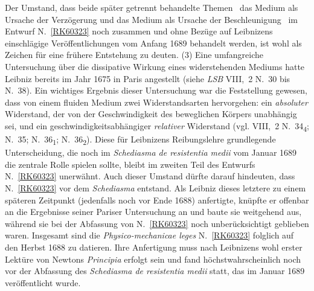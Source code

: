 \begin{ledgroup}
Der Umstand, dass beide später getrennt behandelte Themen \textendash\ das Medium als Ursache der Verzögerung und das Medium als Ursache der Beschleunigung \textendash\ im Entwurf N.~\ref{RK60323} noch zusammen und ohne Bezüge auf Leibnizens einschlägige Veröffentlichungen vom Anfang 1689 behandelt werden, ist wohl als Zeichen für eine frühere Entstehung zu deuten.
\pend%
%
\pstart%
(3) 
Eine umfangreiche Untersuchung über die dissipative Wirkung eines widerstehenden Mediums hatte Leibniz bereits im Jahr 1675 in Paris angestellt (siehe \textit{LSB} VIII,~2 N.~30 bis N.~38).
Ein wichtiges Ergebnis dieser Untersuchung war die Feststellung gewesen, dass von einem fluiden Medium zwei Widerstandsarten hervorgehen: ein \textit{absoluter} Widerstand, der von der Geschwindigkeit des beweglichen Körpers unabhängig sei, und ein geschwindigkeitsabhängiger \textit{relativer} Widerstand %
(vgl. VIII,~2 N.~34\textsubscript{4}; N.~35; N.~36\textsubscript{1}; N.~36\textsubscript{2}).\cite{01368}\cite{01369}\cite{01370}\cite{01371}
Diese für Leibnizens Reibungslehre grundlegende Unterscheidung, %
die noch im \textit{Schediasma de resistentia medii}\cite{01024} vom Januar 1689 die zentrale Rolle spielen sollte, bleibt im zweiten Teil des Entwurfs N.~\ref{RK60323} unerwähnt.
Auch dieser Umstand dürfte darauf hindeuten, dass N.~\ref{RK60323} vor dem \textit{Schediasma}\cite{01024} entstand.
Als Leibniz dieses letztere zu einem späteren Zeitpunkt (jedenfalls noch vor Ende 1688) anfertigte, knüpfte er offenbar an die Ergebnisse seiner Pariser Untersuchung an und baute sie weitgehend aus, während sie bei der Abfassung von N.~\ref{RK60323} noch unberücksichtigt geblieben waren.
\pend%
%
\pstart%
Insgesamt sind die \textit{Physico-mechanicae leges} N.~\ref{RK60323} folglich auf den Herbst 1688 zu datieren.
Ihre Anfertigung muss nach Leibnizens wohl erster Lektüre von Newtons%
\protect{}
\textit{Principia}\cite{00535} erfolgt sein und fand höchstwahrscheinlich noch vor der Abfassung des \textit{Schediasma de resistentia medii}\cite{01024} statt, das im Januar 1689 veröffentlicht wurde.

\end{ledgroup}
